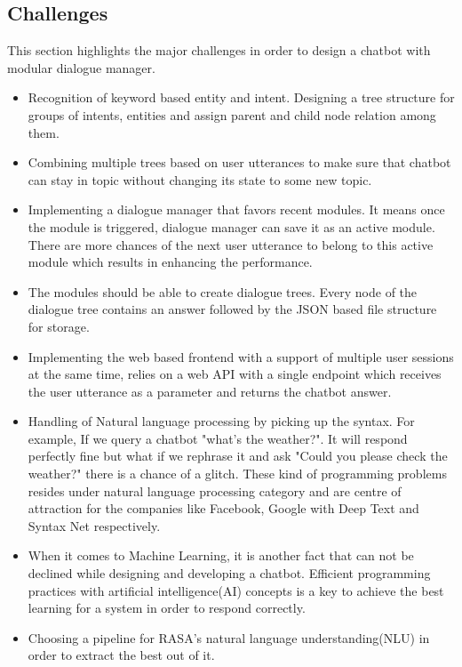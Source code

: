 \subsection{Challenges}
This section highlights the major challenges in order to design a chatbot with modular dialogue manager. 
\begin{itemize}
  \item Recognition of keyword based entity and intent. Designing a tree structure for groups of intents, entities and assign parent and child node relation among them.
   \item Combining multiple trees based on user utterances to make sure that chatbot can stay in topic without changing its state to some new topic.
   \item Implementing a dialogue manager that favors recent modules. It means once the module is triggered, dialogue manager can save it as an active module. There are more chances of the next user utterance to belong to this active module which results in enhancing the performance.
   \item The modules should be able to create dialogue trees. Every node of
   the dialogue tree contains an answer followed by the JSON based file structure for storage.
   \item Implementing the web based frontend with a support of multiple user sessions at the same time, relies on a web API with a single endpoint which receives the user utterance as a parameter and returns the chatbot answer.
   \item Handling of Natural language processing by picking up the syntax. For example, If we query a chatbot "what's the weather?". It will respond perfectly fine but what if we rephrase it and ask "Could you please check the weather?" there is a chance of a glitch. These kind of programming problems resides under natural language processing category and are centre of attraction for the companies like Facebook, Google with Deep Text and Syntax Net respectively. \cite{ProgrammingchallengesofChatbot}
   \item When it comes to Machine Learning, it is another fact that can not be declined while designing and developing a chatbot. Efficient programming practices with artificial intelligence(AI) concepts is a key to achieve the best learning for a system in order to respond correctly.
   \cite{ProgrammingchallengesofChatbot}
   \item Choosing a pipeline for RASA's natural language understanding(NLU) in order to extract the best out of it.
\end{itemize}

